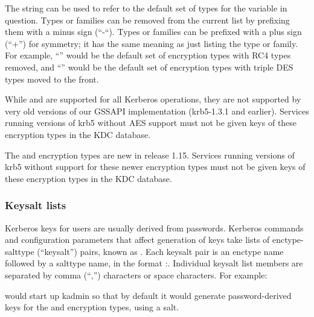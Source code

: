 \documentclass[letterpaper,10pt,english]{sphinxmanual}
\begin{document}
The string  can be used to refer to the default set of
types for the variable in question.  Types or families can be removed
from the current list by prefixing them with a minus sign (“-“).
Types or families can be prefixed with a plus sign (“+”) for symmetry;
it has the same meaning as just listing the type or family.  For
example, “” would be the default set of encryption
types with RC4 types removed, and “” would be the
default set of encryption types with triple DES types moved to the
front.

While  and  are supported for all Kerberos
operations, they are not supported by very old versions of our GSSAPI
implementation (krb5-1.3.1 and earlier).  Services running versions of
krb5 without AES support must not be given keys of these encryption
types in the KDC database.

The  and  encryption types are new in
release 1.15.  Services running versions of krb5 without support for
these newer encryption types must not be given keys of these
encryption types in the KDC database.


\subsubsection{Keysalt lists}
\label{\detokenize{admin/conf_files/kdc_conf:id7}}\label{\detokenize{admin/conf_files/kdc_conf:keysalt-lists}}
Kerberos keys for users are usually derived from passwords.  Kerberos
commands and configuration parameters that affect generation of keys
take lists of enctype-salttype (“keysalt”) pairs, known as .  Each keysalt pair is an enctype name followed by a salttype
name, in the format :.  Individual keysalt list members are
separated by comma (“,”) characters or space characters.  For example:

%
\begin{sphinxVerbatim}[commandchars=\\\{\}]
  
\end{sphinxVerbatim}

would start up kadmin so that by default it would generate
password-derived keys for the  and 
encryption types, using a  salt.
\end{document}
